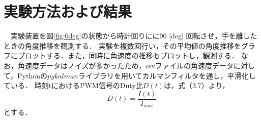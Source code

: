 \section{実験方法および結果}
　実験装置を図\ref{fig:0deg}の状態から時計回りにに90 [deg] 回転させ，手を離したときの角度推移を観測する．
実験を複数回行い，その平均値の角度推移をグラフにプロットする．また，同時に角速度の推移もプロットし，観測する．
なお，角速度データはノイズが多かったため，csvファイルの角速度データに対して，Pythonの$pykalman$ライブラリを用いてカルマンフィルタを通し，平滑化している．
時刻tにおけるPWM信号のDuty比$D(t)$は，式（3.7）より，
\begin{equation}
	D(t)=\frac{I(t)}{I_{max}}
\end{equation}
とする．

